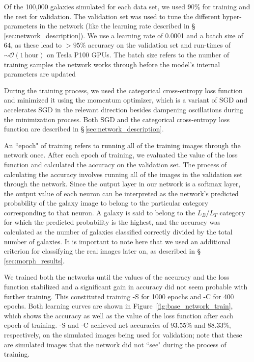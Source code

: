 Of the 100,000 galaxies simulated for each data set, we used $90\%$ for training and the rest for validation. The validation set was used to tune the different hyper-parameters in the network (like the learning rate described in \S\,\ref{sec:network_description}). We use a learning rate of 0.0001 and a batch size of 64, as these lead to $>95\%$ accuracy on the validation set and run-times of $\sim\mathcal{O}(1\mathrm{\,hour})$ on Tesla P100 GPUs. The batch size refers to the number of training samples the network works through before the model's internal parameters are updated

During the training process, we used the categorical cross-entropy loss function and minimized it using the momentum optimizer, which is a variant of SGD and accelerates SGD in the relevant direction besides dampening oscillations during the minimization process. Both SGD and the categorical cross-entropy loss function are described in \S\,\ref{sec:network_description}. 

An ``epoch" of training refers to running all of the training images through the network once. After each epoch of training, we evaluated the value of the loss function and calculated the accuracy on the validation set. The process of calculating the accuracy involves running all of the images in the validation set through the network. Since the output layer in our network is a softmax layer, the output value of each neuron can be interpreted as the network's predicted probability of the galaxy image to belong to the particular category corresponding to that neuron. A galaxy is said to belong to the $L_B/L_T$ category for which the predicted probability is the highest, and the accuracy was calculated as the number of galaxies classified correctly divided by the total number of galaxies. It is important to note here that we used an additional criterion for classifying the real images later on, as described in \S\,\ref{sec:morph_results}.

We trained both the networks until the values of the accuracy and the loss function stabilized and a significant gain in accuracy did not seem probable with further training. This constituted training \gamornet{}-S for 1000 epochs and \gamornet{}-C for 400 epochs. Both learning curves are shown in Figure~\ref{fig:base_network_train}, which shows the accuracy as well as the value of the loss function after each epoch of training. \gamornet{}-S and \gamornet{}-C achieved net accuracies of $93.55\%$ and $88.33\%$, respectively, on the simulated images being used for validation; note that these are simulated images that the network did not ``see" during the process of training. 

